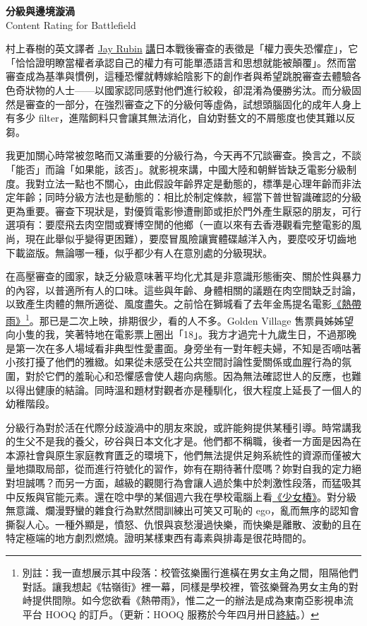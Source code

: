 \documentclass[10pt]{article}
\begin{document}
\begin{flushleft}
\textbf{分級與邊境漩渦}\\
Content Rating for Battlefield\\
\end{flushleft}
\vspace{3em}

村上春樹的英文譯者 \href{https://en.wikipedia.org/wiki/Jay_Rubin}{Jay
Rubin}
\href{https://book.douban.com/subject/34893737/}{講}日本戰後審查的表徵是「權力喪失恐懼症」，它「恰恰證明瞭當權者承認自己的權力有可能單憑語言和思想就能被顛覆」。然而當審查成為基準與慣例，這種恐懼就轉嫁給陰影下的創作者與希望跳脫審查去體驗各色奇狀物的人士{——}以國家認同感對他們進行絞殺，卻混淆為優勝劣汰。而分級固然是審查的一部分，在強烈審查之下的分級何等虛偽，試想頭腦固化的成年人身上有多少
filter，進階飼料只會讓其無法消化，自幼對藝文的不屑態度也使其難以反芻。

我更加關心時常被忽略而又滿重要的分級行為，今天再不冗談審查。換言之，不談「能否」而論「如果能，該否」。就影視來講，中國大陸和朝鮮皆缺乏電影分級制度。我對立法一點也不關心，由此假設年齡界定是動態的，標準是心理年齡而非法定年齡；同時分級方法也是動態的：相比於制定條款，經當下普世智識確認的分級更為重要。審查下現狀是，對優質電影慘遭刪節或拒於門外產生厭惡的朋友，可行選項有：要麼飛去肉空間或賽博空閒的他鄉（一直以來有去香港觀看完整電影的風尚，現在此舉似乎變得更困難），要麼冒風險讓實體碟越洋入內，要麼咬牙切齒地下載盜版。無論哪一種，似乎都少有人在意別處的分級現狀。

在高壓審查的國家，缺乏分級意味著平均化尤其是非意識形態衝突、關於性與暴力的內容，以普適所有人的口味。這些與年齡、身體相關的議題在肉空間缺乏討論，以致產生肉體的無所適從、風度盡失。之前恰在獅城看了去年金馬提名電影\href{https://zh.wikipedia.org/wiki/\%E7\%86\%B1\%E5\%B8\%B6\%E9\%9B\%A8}{《熱帶雨》}\footnote{別註：我一直想展示其中段落：校管弦樂團行進橫在男女主角之間，阻隔他們對話。讓我想起《牯嶺街》裡一幕，同樣是學校裡，管弦樂聲為男女主角的對峙提供間隙。如今您欲看《熱帶雨》，惟二之一的辦法是成為東南亞影視串流平台
HOOQ 的訂戶。（更新：HOOQ
服務於今年四月卅日\href{https://hooq.tv}{終結}。）}。那已是二次上映，排期很少，看的人不多。Golden
Village
售票員姊姊望向小隻的我，笑著特地在電影票上圈出「18」。我方才過完十九歲生日，不過那晚是第一次在多人場域看非典型性愛畫面。身旁坐有一對年輕夫婦，不知是否嘀咕著小孩打擾了他們的雅緻。如果從未感受在公共空間討論性愛關係或血腥行為的氛圍，對於它們的羞恥心和恐懼感會使人趨向病態。因為無法確認世人的反應，也難以得出健康的結論。同時溫和題材對觀者亦是種馴化，很大程度上延長了一個人的幼稚階段。

分級行為對於活在代際分歧漩渦中的朋友來說，或許能夠提供某種引導。時常講我的生父不是我的養父，矽谷與日本文化才是。他們都不稱職，後者一方面是因為在本源社會與原生家庭教育匱乏的環境下，他們無法提供足夠系統性的資源而僅被大量地擷取局部，從而進行符號化的習作，妳有在期待著什麼嗎？妳對自我的定力絕對坦誠嗎？而另一方面，越級的觀閱行為會讓人過於集中於刺激性段落，而猛吸其中反叛與官能元素。還在唸中學的某個週六我在學校電腦上看\href{https://en.wikipedia.org/wiki/Sh\%C5\%8Djo_Tsubaki}{《少女椿》}。對分級無意識、爛漫野蠻的雜食行為默然間訓練出可笑又可恥的
ego，亂而無序的認知會撕裂人心。一種外顯是，憤怒、仇恨與哀愁漫過快樂，而快樂是離散、波動的且在特定極端的地方劇烈燃燒。證明某樣東西有毒素與排毒是很花時間的。
\end{document}
